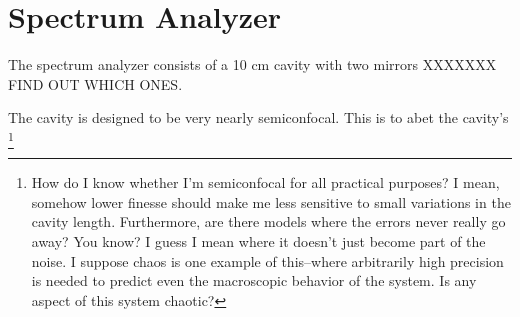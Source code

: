 \section{Spectrum Analyzer}

The spectrum analyzer consists of a 10 cm cavity with two mirrors XXXXXXX FIND OUT WHICH ONES. 

The cavity is designed to be very nearly semiconfocal. This is to abet the cavity's \footnote{How do I know whether I'm semiconfocal for all practical purposes? I mean, somehow lower finesse should make me less sensitive to small variations in the cavity length. Furthermore, are there models where the errors never really go away? You know? I guess I mean where it doesn't just become part of the noise. I suppose chaos is one example of this--where arbitrarily high precision is needed to predict even the macroscopic behavior of the system. Is any aspect of this system chaotic?}
